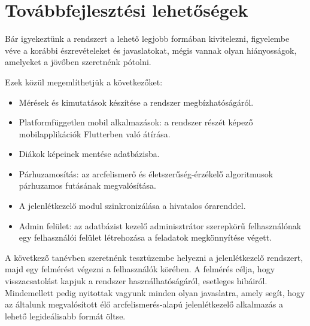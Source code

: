 \chapter{Továbbfejlesztési lehetőségek} \label{chapter10}

Bár igyekeztünk a rendszert a lehető legjobb formában kivitelezni, figyelembe véve a korábbi észrevételeket és javaslatokat, mégis vannak olyan hiányosságok, amelyeket a jövőben szeretnénk pótolni.

Ezek közül megemlíthetjük a következőket:

\begin{itemize}
    \item Mérések és kimutatások készítése a rendszer megbízhatóságáról.
    \item Platformfüggetlen mobil alkalmazások: a rendszer részét képező mobilapplikációk Flutterben való átírása.
    \item Diákok képeinek mentése adatbázisba.
    \item Párhuzamosítás: az arcfelismerő és életszerűség-érzékelő algoritmusok párhuzamos futásának megvalósítása.
    \item A jelenlétkezelő modul szinkronizálása a hivatalos órarenddel.
    \item Admin felület: az adatbázist kezelő adminisztrátor szerepkörű felhasználónak egy felhasználói felület létrehozása a feladatok megkönnyítése végett.
    
\end{itemize}

A következő tanévben szeretnénk tesztüzembe helyezni a jelenlétkezelő rendszert, majd egy felmérést végezni a felhasználók körében. A felmérés célja, hogy visszacsatolást kapjuk a rendszer használhatóságáról, esetleges hibáiról. Mindemellett pedig nyitottak vagyunk minden olyan javaslatra, amely segít, hogy az általunk megvalósított élő arcfelismerés-alapú jelenlétkezelő alkalmazás a lehető legideálisabb formát öltse.